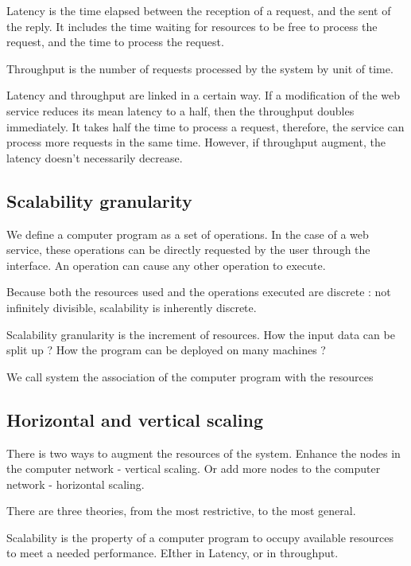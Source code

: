 Latency is the time elapsed between the reception of a request, and the sent of the reply.
It includes the time waiting for resources to be free to process the request, and the time to process the request.

Throughput is the number of requests processed by the system by unit of time.

Latency and throughput are linked in a certain way.
If a modification of the web service reduces its mean latency to a half, then the throughput doubles immediately.
It takes half the time to process a request, therefore, the service can process more requests in the same time.
However, if throughput augment, the latency doesn't necessarily decrease.

\subsection{Scalability granularity}

We define a computer program as a set of operations.
In the case of a web service, these operations can be directly requested by the user through the interface.
An operation can cause any other operation to execute.

Because both the resources used and the operations executed are discrete : not infinitely divisible, scalability is inherently discrete.


Scalability granularity is the increment of resources.
How the input data can be split up ?
How the program can be deployed on many machines ?






We call system the association of the computer program with the resources


\subsection{Horizontal and vertical scaling}

There is two ways to augment the resources of the system.
Enhance the nodes in the computer network - vertical scaling.
Or add more nodes to the computer network - horizontal scaling.



There are three theories, from the most restrictive, to the most general.


Scalability is the property of a computer program to occupy available resources to meet a needed performance.
EIther in Latency, or in throughput.







